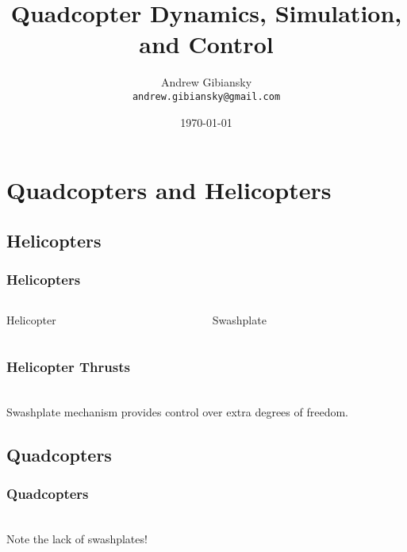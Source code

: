 \documentclass{beamer}
\title{Quadcopter Dynamics, Simulation, and Control}
\author{Andrew Gibiansky \\ \texttt{andrew.gibiansky@gmail.com}}
\date{\today}
\begin{document}
\begin{frame}
    \titlepage
\end{frame}

\section{Quadcopters and Helicopters}
\subsection{Helicopters}
\begin{frame}
    \frametitle{Helicopters}
    \begin{columns}
        \begin{column}{0.5\textwidth}
            \begin{center}
                \huge{Helicopter}
            \end{center}
        \end{column}
        \begin{column}{0.5\textwidth}
            \begin{center}
                \huge{Swashplate}
            \end{center}
        \end{column}
    \end{columns}
\end{frame}

\begin{frame}
    \frametitle{Helicopter Thrusts}
    \begin{center}
         \\
        Swashplate mechanism provides control over extra degrees of freedom.
    \end{center}
\end{frame}

\subsection{Quadcopters}
\begin{frame}
    \frametitle{Quadcopters}
    \begin{center}
         \\
        Note the lack of swashplates! 
    \end{center}
\end{frame}
\end{document}
